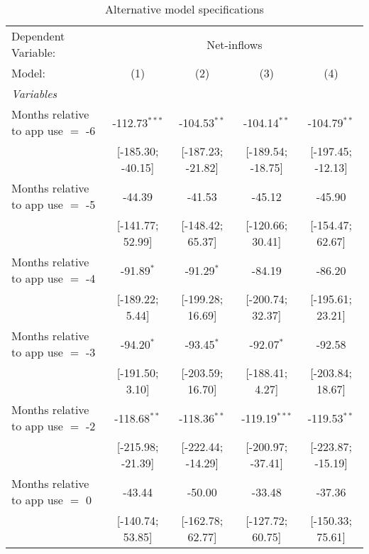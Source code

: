 
\begin{table}[htbp]
   \centering
   \tiny
   \begin{threeparttable}[b]
      \caption{\label{tab:netflows_alt} Alternative model specifications}
      \begin{tabular}{lcccc}
         \tabularnewline \midrule \midrule
         Dependent Variable: & \multicolumn{4}{c}{Net-inflows}\\
         Model:                            & (1)               & (2)               & (3)               & (4)\\  
         \midrule
         \emph{Variables}\\
         Months relative to app use $=$ -6 & -112.73$^{***}$   & -104.53$^{**}$    & -104.14$^{**}$    & -104.79$^{**}$\\   
                                           & [-185.30; -40.15] & [-187.23; -21.82] & [-189.54; -18.75] & [-197.45; -12.13]\\   
         Months relative to app use $=$ -5 & -44.39            & -41.53            & -45.12            & -45.90\\   
                                           & [-141.77; 52.99]  & [-148.42; 65.37]  & [-120.66; 30.41]  & [-154.47; 62.67]\\   
         Months relative to app use $=$ -4 & -91.89$^{*}$      & -91.29$^{*}$      & -84.19            & -86.20\\   
                                           & [-189.22; 5.44]   & [-199.28; 16.69]  & [-200.74; 32.37]  & [-195.61; 23.21]\\   
         Months relative to app use $=$ -3 & -94.20$^{*}$      & -93.45$^{*}$      & -92.07$^{*}$      & -92.58\\   
                                           & [-191.50; 3.10]   & [-203.59; 16.70]  & [-188.41; 4.27]   & [-203.84; 18.67]\\   
         Months relative to app use $=$ -2 & -118.68$^{**}$    & -118.36$^{**}$    & -119.19$^{***}$   & -119.53$^{**}$\\   
                                           & [-215.98; -21.39] & [-222.44; -14.29] & [-200.97; -37.41] & [-223.87; -15.19]\\   
         Months relative to app use $=$ 0  & -43.44            & -50.00            & -33.48            & -37.36\\   
                                           & [-140.74; 53.85]  & [-162.78; 62.77]  & [-127.72; 60.75]  & [-150.33; 75.61]\\   

\end{tabular}
\end{threeparttable}
\end{table}
